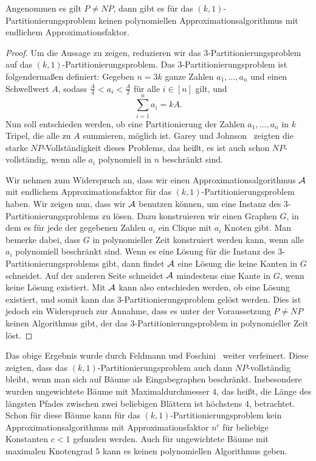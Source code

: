 \begin{thm}\label{thm:np_comp}
    Angenommen es gilt $P \neq NP$, dann gibt es für das $(k,1)$\hyp Partitionierungsproblem keinen polynomiellen Approximationsalgorithmus mit endlichem Approximationsfaktor.
\end{thm}
\begin{proof}
    Um die Aussage zu zeigen, reduzieren wir das $3$\hyp Partitionierungsproblem auf das $(k,1)$\hyp Partitionierungsproblem. 
    Das $3$\hyp Partitionierungsproblem ist folgendermaßen definiert: Gegeben $n = 3k$ ganze Zahlen $a_1,\ldots, a_n$ und einen Schwellwert $A$, sodass $\frac{A}{4} < a_i < \frac{A}{2}$ für alle $i \in [n]$ gilt, und 
    \begin{equation*}
        \sum_{i=1}^{n} a_i = kA.
    \end{equation*}
    Nun soll entschieden werden, ob eine Partitionierung der Zahlen $a_1, \ldots, a_n$ in $k$ Tripel, die alle zu $A$ summieren, möglich ist. 
    Garey und Johnson~\parencite{gj79} zeigten die starke $NP$\hyp Vollständigkeit dieses Problems, das heißt, es ist auch schon $NP$\hyp vollständig, wenn alle $a_i$ polynomiell in $n$ beschränkt sind.

    Wir nehmen zum Widerspruch an, dass wir einen Approximationsalgorithmus $\mathcal{A}$ mit endlichem Approximationsfaktor für das $(k,1)$\hyp Partitionierungsproblem haben. 
    Wir zeigen nun, dass wir $\mathcal{A}$ benutzen können, um eine Instanz des $3$\hyp Partitionierungsproblems zu lösen.
    Dazu konstruieren wir einen Graphen $G$, in dem es für jede der gegebenen Zahlen $a_i$ ein Clique mit $a_i$ Knoten gibt.
	Man bemerke dabei, dass $G$ in polynomieller Zeit konstruiert werden kann, wenn alle $a_i$ polynomiell beschränkt sind.
    Wenn es eine Lösung für die Instanz des $3$\hyp Partitionierungsproblems gibt, dann findet $\mathcal{A}$ eine Lösung die keine Kanten in $G$ schneidet. 
    Auf der anderen Seite schneidet $\mathcal{A}$ mindestens eine Kante in $G$, wenn keine Lösung existiert.
    Mit $\mathcal{A}$ kann also entschieden werden, ob eine Lösung existiert, und somit kann das $3$\hyp Partitionierungsproblem gelöst werden.
    Dies ist jedoch ein Widerspruch zur Annahme, dass es unter der Voraussetzung $P \neq NP$ keinen Algorithmus gibt, der das $3$\hyp Partitionierungsproblem in polynomieller Zeit löst.
\end{proof}

\begin{rem}
    Das obige Ergebnis wurde durch Feldmann und Foschini~\parencite{ff13} weiter verfeinert. 
    Diese zeigten, dass das $(k,1)$\hyp Partitionierungsproblem auch dann $NP$\hyp vollständig bleibt, wenn man sich auf Bäume als Eingabegraphen beschränkt.
    Insbesondere wurden ungewichtete Bäume mit Maximaldurchmesser $4$, das heißt, die Länge des längsten Pfades zwischen zwei beliebigen Blättern ist höchstens $4$, betrachtet.
    Schon für diese Bäume kann für das $(k,1)$\hyp Partitionierungsproblem kein Approximationsalgorithmus mit Approximationsfaktor $n^c$ für beliebige Konstanten $c < 1$ gefunden werden.
    Auch für ungewichtete Bäume mit maximalen Knotengrad $5$ kann es keinen polynomiellen Algorithmus geben.
\end{rem}


